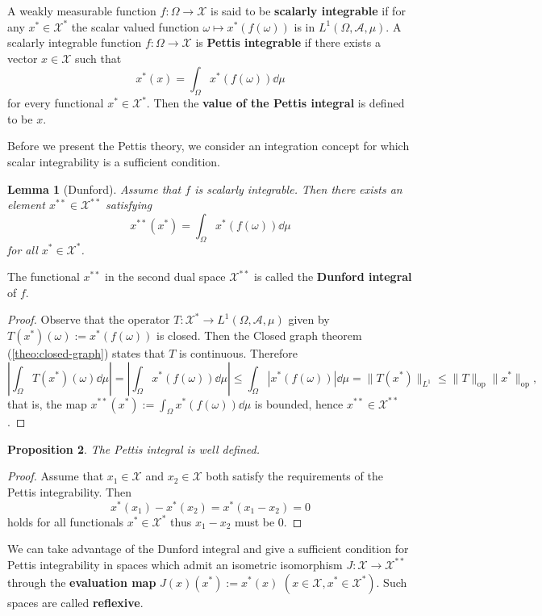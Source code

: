 \documentclass[a4paper, 12pt]{article}
\newtheorem{lem}{Lemma}[section]
\newtheorem{state}[lem]{Proposition}
\newcommand{\ignore}[1]{}
\begin{document}
A weakly measurable function $f\colon\Omega \to \mathcal{X}$ is said to be \textbf{scalarly integrable} if for any $x^* \in \mathcal{X}^*$ the scalar valued function $\omega \mapsto x^*(f(\omega))$ is in $L^1(\Omega,\mathcal{A}, \mu)$. A scalarly integrable function $f\colon\Omega\to \mathcal{X}$ is \textbf{Pettis integrable} if there exists a vector $x \in \mathcal{X}$ such that
$$
x^*(x) = \int_{\Omega} x^*(f(\omega)) \dd{\mu}
$$
for every functional $x^* \in \mathcal{X}^*$. Then the \textbf{value of the Pettis integral} is defined to be $x$.

Before we present the Pettis theory, we consider an integration concept for which scalar integrability is a sufficient condition.
\begin{lem}[Dunford] \label{lem:dunford} Assume that $f$ is scalarly integrable. Then there exists an element $x^{**} \in \mathcal{X}^{**}$ satisfying
$$
x^{**}(x^*) = \int_{\Omega} x^*(f(\omega)) \dd{\mu}
$$
for all $x^* \in \mathcal{X}^*$.
\end{lem}
The functional $x^{**}$ in the second dual space $\mathcal{X}^{**}$ is called the \textbf{Dunford integral} of $f$.
\begin{proof} Observe that the operator $T\colon \mathcal{X}^* \to L^1(\Omega,\mathcal{A}, \mu)$ given by $T(x^*)(\omega):=x^*(f(\omega))$ is closed.\ignore{gondold meg} Then the Closed graph theorem (\ref{theo:closed-graph}) states that $T$ is continuous. Therefore
$$
\left| \int_{\Omega} T(x^*)(\omega) \dd{\mu} \right| = \left| \int_{\Omega} x^*(f(\omega)) \dd{\mu} \right| \leqslant \int_{\Omega} |x^*(f(\omega))| \dd{\mu} = \| T(x^*) \|_{L^1} \leqslant \| T \|_{\mathrm{op}} \| x^* \|_{\mathrm{op}},
$$
that is, the map $x^{**}(x^*) := \int_{\Omega} x^*(f(\omega)) \dd{\mu}$ is bounded, hence $x^{**} \in \mathcal{X}^{**}$.
\end{proof}
\begin{state} The Pettis integral is well defined.
\end{state}
\begin{proof} Assume that $x_1 \in \mathcal{X}$ and $x_2 \in \mathcal{X}$ both satisfy the requirements of the Pettis integrability. Then
$$
x^*(x_1) - x^*(x_2) = x^*(x_1-x_2) = 0
$$
holds for all functionals $x^* \in \mathcal{X}^*$ thus $x_1 - x_2$ must be $0$.
\end{proof}
We can take advantage of the Dunford integral and give a sufficient condition for Pettis integrability in spaces which admit an isometric isomorphism $J \colon \mathcal{X} \to \mathcal{X}^{**}$ through the \textbf{evaluation map} $J(x)(x^*):=x^*(x)$ $(x \in \mathcal{X}, x^{*} \in \mathcal{X}^*)$. Such spaces are called \textbf{reflexive}.
\end{document}
